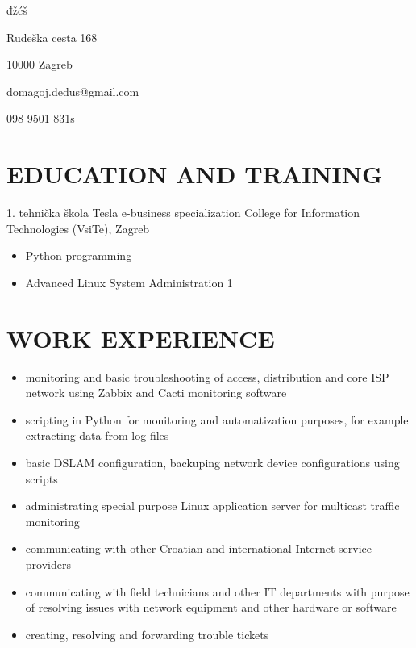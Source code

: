 \documentclass{my_cv}
\begin{document}
đžćš

Rudeška cesta 168

10000 Zagreb

domagoj.dedus@gmail.com

098 9501 831s
\section{EDUCATION AND TRAINING}
1. tehnička škola Tesla
e-business specialization
College for Information Technologies (VsiTe), Zagreb
\begin{itemize}
    \setlength\itemsep{0.1cm}
    \item Python programming
    \item Advanced Linux System Administration 1
\end{itemize}

\section{WORK EXPERIENCE}
\begin{itemize}
    \setlength\itemsep{0.1cm}
    \item monitoring and basic troubleshooting of access, distribution and core ISP network using Zabbix and
Cacti monitoring software
    \item scripting in Python for monitoring and automatization purposes, for example extracting data from log
files
    \item basic DSLAM configuration, backuping network device configurations using scripts
    \item administrating special purpose Linux application server for multicast traffic monitoring
    \item communicating with other Croatian and international Internet service providers
    \item communicating with field technicians and other IT departments with purpose of resolving issues with
network equipment and other hardware or software
    \item creating, resolving and forwarding trouble tickets
\end{itemize}
\end{document}
